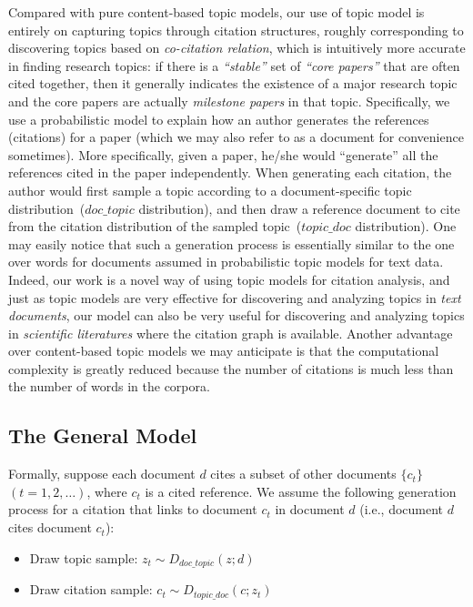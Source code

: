 Compared with pure content-based topic models, our use of topic model is
entirely on capturing topics through citation structures, roughly corresponding
to discovering topics based on \emph{co-citation relation}, which is intuitively
more accurate in finding research topics: if there is a \emph{``stable''} set of
\emph{``core papers''} that are often cited together, then it generally
indicates the existence of a major research topic and the core papers are
actually \emph{milestone papers} in that topic. Specifically, we use a
probabilistic model to explain how an author generates the references
(citations) for a paper (which we may also refer to as a document for
convenience sometimes).  More specifically, given a paper, he/she would
``generate'' all the references cited in the paper independently.  When
generating each citation, the author would first sample a topic according to a
document-specific topic distribution~($doc\_topic$ distribution), and then draw
a reference document to cite from the citation distribution of the sampled
topic~($topic\_doc$ distribution).  One may easily notice that such a generation
process is essentially similar to the one over words for documents assumed in
probabilistic topic models for text data.  Indeed, our work is a novel way of
using topic models for citation analysis, and just as topic models are very
effective for discovering and analyzing topics in \emph{text documents}, our
model can also be very useful for discovering and analyzing topics in
\emph{scientific literatures} where the citation graph is available. Another
advantage over content-based topic models we may anticipate is that the
computational complexity is greatly reduced because the number of citations is
much less than the number of words in the corpora.

\subsection{The General Model}

Formally, suppose each document $d$ cites a subset of other documents
$\{c_t\}$~$(t=1,2,\ldots)$, where $c_t$ is a cited reference. We
assume the following generation process for a citation that links to document
$c_t$ in document $d$ (i.e., document $d$ cites document $c_t$):

\begin{itemize}
\item  Draw topic sample: $z_t \sim D_{doc\_topic}(z;d)$
\item  Draw citation sample: $c_t \sim D_{topic\_doc}(c;z_t)$
\end{itemize}

